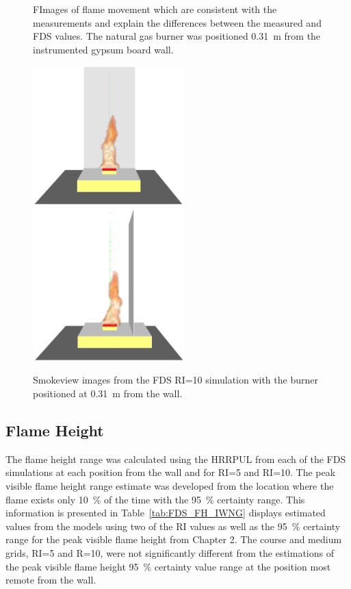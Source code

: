 \documentclass[twoside]{uocthesis}
\begin{document}
{\begin{figure}[ht!]
  \caption[Images of flame movement which are consistent with the measurements and explain the differences between the measured and FDS values.]{FImages of flame movement which are consistent with the measurements and explain the differences between the measured and FDS values.  The natural gas burner was positioned 0.31~m from the instrumented gypsum board wall.}
  \label{FDS_IWNG_Flame_comp}
\end{figure}

\begin{figure}[h]
  \centering
  \includegraphics[width=2.3in]{../Figures/FDS_NG_80kW_GBWall_frontview}
  \includegraphics[width=2.3in]{../Figures/FDS_NG_80kW_GBWall_sideview}   \\
  \caption[Smokeview images from the FDS RI=10 simulation with the burner positioned at 0.31~m from the wall.] {Smokeview images from the FDS RI=10 simulation with the burner positioned at 0.31~m from the wall.}
  \label{FDS_IWNG_SMV_comp}
\end{figure}


\subsection{Flame Height}

The flame height range was calculated using the HRRPUL from each of the FDS simulations at each position from the wall and for RI=5 and RI=10.  The peak visible flame height range estimate was developed from the location where the flame exists only 10~\% of the time with the 95~\% certainty range.  This information is presented in Table~\ref{tab:FDS_FH_IWNG} displays estimated values from the models using two of the RI values as well as the 95~$\%$ certainty range for the peak visible flame height from Chapter 2.  The course and medium grids, RI=5 and R=10, were not significantly different from the estimations of the peak visible flame height 95~$\%$ certainty value range at the position most remote from the wall.

}
\end{document}
